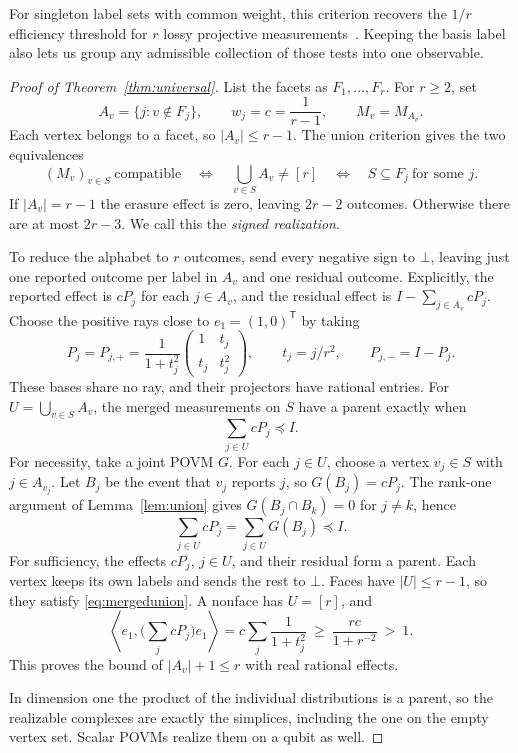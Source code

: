 \documentclass[11pt,a4paper]{article}
\theoremstyle{definition}
\newcommand{\Id}{I}
\begin{document}
For singleton label sets with common weight, this criterion recovers the
\(1/r\) efficiency threshold for \(r\) lossy projective
measurements~\cite{SC}. Keeping the basis label also lets us group any
admissible collection of those tests into one observable.

\begin{proof}[Proof of Theorem~\ref{thm:universal}]
List the facets as \(F_1,\ldots,F_r\). For \(r\ge2\), set
\begin{equation}\label{eq:facetchoice}
       A_v=\{j:v\notin F_j\},\qquad w_j=c=\frac1{r-1},
       \qquad M_v=M_{A_v}.
\end{equation}
Each vertex belongs to a facet, so \(|A_v|\le r-1\). The union criterion
gives the two equivalences
\[
 (M_v)_{v\in S}\ \text{compatible}
 \quad\Longleftrightarrow\quad \bigcup_{v\in S}A_v\ne[r]
 \quad\Longleftrightarrow\quad S\subseteq F_j\ \text{for some }j .
\]
If \(|A_v|=r-1\) the erasure effect is zero, leaving \(2r-2\) outcomes.
Otherwise there are at most \(2r-3\). We call this the \emph{signed
realization}.

To reduce the alphabet to \(r\) outcomes, send every negative sign to
\(\bot\), leaving just one reported outcome per label in \(A_v\) and one
residual outcome. Explicitly, the reported effect is \(cP_j\) for each
\(j\in A_v\), and the residual effect is \(\Id-\sum_{j\in A_v}cP_j\).
Choose the positive rays close to \(e_1=(1,0)^{\mathsf T}\) by taking
\begin{equation}\label{eq:rational}
 P_j=P_{j,+}=\frac1{1+t_j^2}
       \begin{pmatrix}1&t_j\\ t_j&t_j^2\end{pmatrix},\qquad
 t_j=j/r^2,\qquad P_{j,-}=\Id-P_j .
\end{equation}
These bases share no ray, and their projectors have rational entries.
For \(U=\bigcup_{v\in S}A_v\), the merged measurements on \(S\) have a
parent exactly when
\begin{equation}\label{eq:mergedunion}
                    \sum_{j\in U}cP_j\preceq\Id .
\end{equation}
For necessity, take a joint POVM \(G\). For each \(j\in U\), choose a
vertex \(v_j\in S\) with \(j\in A_{v_j}\). Let \(B_j\) be the event that
\(v_j\) reports \(j\), so \(G(B_j)=cP_j\). The rank-one argument of
Lemma~\ref{lem:union} gives \(G(B_j\cap B_k)=0\) for \(j\ne k\), hence
\[
              \sum_{j\in U}cP_j=\sum_{j\in U}G(B_j)\preceq\Id.
\]
For sufficiency, the effects \(cP_j\), \(j\in U\), and their residual
form a parent. Each vertex keeps its own
labels and sends the rest to \(\bot\). Faces have \(|U|\le r-1\), so they
satisfy \eqref{eq:mergedunion}. A nonface has \(U=[r]\), and
\[
   \left\langle e_1,\Big(\sum_jcP_j\Big)e_1\right\rangle
       =c\sum_j\frac1{1+t_j^2}\ \ge\ \frac{rc}{1+r^{-2}}\ >\ 1 .
\]
This proves the bound of \(|A_v|+1\le r\) with real rational effects.

In dimension one the product of the individual distributions is a parent,
so the realizable complexes are exactly the simplices, including the one
on the empty vertex set. Scalar POVMs realize them on a qubit as well.
\end{proof}
\end{document}
